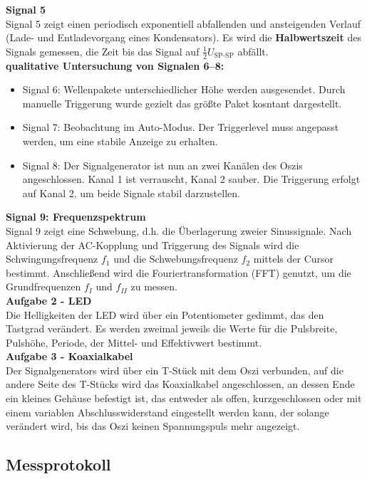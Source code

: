 \textbf{Signal 5}\\
Signal 5 zeigt einen periodisch exponentiell abfallenden und ansteigenden Verlauf (Lade- und Entladevorgang eines Kondensators). Es wird die \textbf{Halbwertszeit} des Signals gemessen, die Zeit bis das Signal auf \(\frac{1}{2}U_\text{SP-SP}\) abfällt.
\vspace{0.5cm}\\
\textbf{qualitative Untersuchung von Signalen 6–8:}
\begin{itemize}
    \item Signal 6: Wellenpakete unterschiedlicher Höhe werden ausgesendet. Durch manuelle Triggerung wurde gezielt das größte Paket kosntant dargestellt.
    \item Signal 7: Beobachtung im Auto-Modus. Der Triggerlevel muss angepasst werden, um eine stabile Anzeige zu erhalten.
    \item Signal 8: Der Signalgenerator ist nun an zwei Kanälen des Oszis angeschlossen. Kanal 1 ist verrauscht, Kanal 2 sauber. Die Triggerung erfolgt auf Kanal 2, um beide Signale stabil darzustellen.
\end{itemize}
\vspace{0.5cm}
\textbf{Signal 9: Frequenzspektrum}\\
Signal 9 zeigt eine Schwebung, d.h. die Überlagerung zweier Sinussignale. Nach Aktivierung der AC-Kopplung und Triggerung des Signals wird die Schwingungsfrequenz \(f_1\) und die Schwebungsfrequenz \(f_2\) mittels der Cursor bestimmt. Anschließend wird die Fouriertransformation (FFT) genutzt, um die Grundfrequenzen \(f_I\) und \(f_{II}\) zu messen.
\vspace{0.5cm}\\
\textbf{Aufgabe 2 - LED}\\
Die Helligkeiten der LED wird über ein Potentiometer gedimmt, das den Tastgrad verändert. Es werden zweimal jeweils die Werte für die Pulsbreite, Pulshöhe, Periode, der Mittel- und Effektivwert bestimmt. 
\vspace{0.5cm}\\
\textbf{Aufgabe 3 - Koaxialkabel}\\
Der Signalgenerators wird über ein T-Stück mit dem Oszi verbunden,
auf die andere Seite des T-Stücks wird das Koaxialkabel angeschlossen, an dessen Ende ein kleines Gehäuse befestigt ist, das entweder als offen, kurzgeschlossen oder mit einem variablen Abschlusswiderstand eingestellt werden kann, der solange verändert wird, bis das Oszi keinen Spannungspuls mehr angezeigt.

\vfill
\subsection{Messprotokoll}
